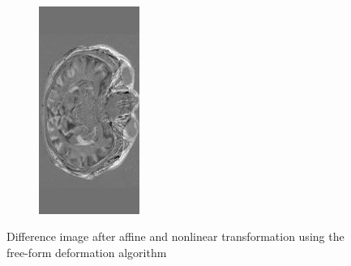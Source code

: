 \documentclass[11pt,a4paper,oneside]{report}
\begin{document}
\begin{figure}[H]
\begin{subfigure}[b]{0.3\textwidth}
        \end{subfigure}
        ~~~~ %
        \begin{subfigure}[b]{0.3\textwidth}
                \includegraphics[width=\textwidth, height=\textwidth, trim=0 20 0 20, clip=true, angle=90 ]{figures/diff/t1Nonlin_z.jpg}
        \end{subfigure}
        \caption{Difference image after affine and nonlinear transformation using the free-form deformation algorithm}\label{fig:f3d}
\end{figure}
\end{document}
